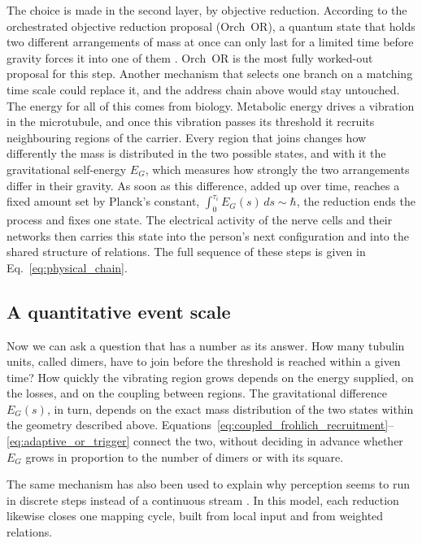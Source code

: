 The choice is made in the second layer, by objective reduction. According to the
orchestrated objective reduction proposal (Orch~OR), a quantum state that holds two
different arrangements of mass at once can only last for a limited time before gravity
forces it into one of them \citep{penrose1996,hameroff2014}. Orch~OR is the most
fully worked-out proposal for this step. Another mechanism that selects one branch on
a matching time scale could replace it, and the address chain above would stay
untouched. The energy for all of
this comes from biology. Metabolic energy drives a vibration in the microtubule, and
once this vibration passes its threshold it recruits neighbouring regions of the
carrier. Every region that joins changes how differently the mass is distributed in
the two possible states, and with it the gravitational self-energy $E_G$, which
measures how strongly the two arrangements differ in their gravity. As soon as this
difference, added up over time, reaches a fixed amount set by Planck's constant,
$\int_0^{\tau_i}E_G(s)\,ds\sim\hbar$, the reduction ends the process and fixes one
state. The electrical activity of the nerve cells and their networks then carries this
state into the person's next configuration and into the shared structure of
relations. The full sequence of these steps is given in Eq.~\eqref{eq:physical_chain}.

\subsection{A quantitative event scale}

Now we can ask a question that has a number as its answer. How many tubulin units,
called dimers, have to join before the threshold is reached within a given time? How
quickly the vibrating region grows depends on the energy supplied, on the losses, and
on the coupling between regions. The gravitational difference $E_G(s)$, in turn,
depends on the exact mass distribution of the two states within the geometry
described above.
Equations~\eqref{eq:coupled_frohlich_recruitment}--\eqref{eq:adaptive_or_trigger}
connect the two, without deciding in advance whether $E_G$ grows in proportion to the
number of dimers or with its square.

The same mechanism has also been used to explain why perception seems to run in
discrete steps instead of a continuous stream \citep{wiestpuniani2025}. In this
model, each reduction likewise closes one mapping cycle, built from local input and
from weighted relations.

